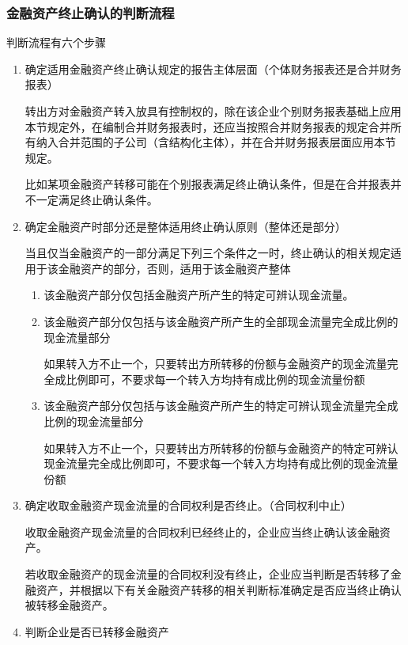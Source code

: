 \documentclass[UTF8,12pt]{ctexart}
\numberwithin{equation}{section} %
\numberwithin{figure}{section}
\numberwithin{table}{section}
\begin{document}
	\subsubsection{金融资产终止确认的判断流程}
	判断流程有六个步骤
	\begin{enumerate}
		\item 确定适用金融资产终止确认规定的报告主体层面（个体财务报表还是合并财务报表）
		
		转出方对金融资产转入放具有控制权的，除在该企业个别财务报表基础上应用本节规定外，在编制合并财务报表时，还应当按照合并财务报表的规定合并所有纳入合并范围的子公司（含结构化主体），并在合并财务报表层面应用本节规定。
		
		比如某项金融资产转移可能在个别报表满足终止确认条件，但是在合并报表并不一定满足终止确认条件。
		
		\item 确定金融资产时部分还是整体适用终止确认原则（整体还是部分）
		
		当且仅当金融资产的一部分满足下列三个条件之一时，终止确认的相关规定适用于该金融资产的部分，否则，适用于该金融资产整体
		\begin{enumerate}
			\item 该金融资产部分仅包括金融资产所产生的特定可辨认现金流量。
			
			\item 该金融资产部分仅包括与该金融资产所产生的全部现金流量完全成比例的现金流量部分
			
			如果转入方不止一个，只要转出方所转移的份额与金融资产的现金流量完全成比例即可，不要求每一个转入方均持有成比例的现金流量份额
			
			\item 该金融资产部分仅包括与该金融资产所产生的特定可辨认现金流量完全成比例的现金流量部分
			
			如果转入方不止一个，只要转出方所转移的份额与金融资产的特定可辨认现金流量完全成比例即可，不要求每一个转入方均持有成比例的现金流量份额
			
		\end{enumerate}
		
		\item 确定收取金融资产现金流量的合同权利是否终止。（合同权利中止）
		
		收取金融资产现金流量的合同权利已经终止的，企业应当终止确认该金融资产。
		
		若收取金融资产的现金流量的合同权利没有终止，企业应当判断是否转移了金融资产，并根据以下有关金融资产转移的相关判断标准确定是否应当终止确认被转移金融资产。
		
		\item 判断企业是否已转移金融资产
		

\end{enumerate}
\end{document}
